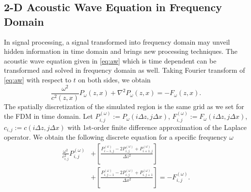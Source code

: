 \documentclass[11pt,titlepage]{article}
\theoremstyle{plain}
\theoremstyle{definition}
\theoremstyle{remark}
\numberwithin{equation}{section}
\begin{document}
\subsection{2-D Acoustic Wave Equation in Frequency Domain}
In signal processing, a signal transformed into frequency domain may unveil hidden information in time domain and brings new processing techniques. The acoustic wave equation given in \eqref{eq:aw} which is time dependent can be transformed and solved in frequency domain as well. Taking Fourier transform of \eqref{eq:aw} with respect to $t$ on both sides, we obtain
  \begin{equation}
  \frac{\omega^2}{c^2(z, x)}P_{\omega}(z, x) + \nabla^2 P_{\omega}(z, x) =- F_{\omega}(z, x).
  \end{equation}
 The spatially discretization of the simulated region is the same grid as we set for the FDM in time domain. Let $P_{i,j}^{(\omega)} := P_{\omega}(i\Delta z, j\Delta x)$, $F_{i,j}^{(\omega)} := 
  F_{\omega}(i\Delta z, j\Delta x)$, $c_{i,j} := c(i\Delta z, j\Delta x)$  with 1st-order finite difference approximation of the Laplace operator. We obtain the following discrete equation for a specific frequency $\omega$
  \begin{equation}
  \begin{aligned}
  \frac{\omega^2}{c_{i,j}^2} P_{i,j}^{(\omega)} &+\left[ \frac{P_{i-1,j}^{(\omega)} - 2P_{i,j}^{(\omega)} + P_{i+1,j}^{(\omega)}}{\Delta z^2} \right] \\&+\left[ \frac{P_{i,j-1}^{(\omega)} - 2P_{i,j}^{(\omega)} + P_{i,j+1}^{(\omega)}}{\Delta x^2} \right] =- F_{i,j}^{(\omega)}.
  \end{aligned}
  \end{equation}
  
\end{document}
